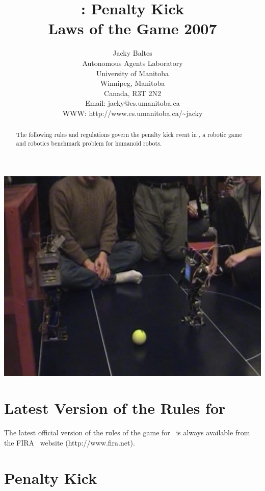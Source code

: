\documentclass[12pt]{hurocup}
\begin{document}
\title{\HuroCup: Penalty Kick\\
  Laws of the Game 2007}


\author{Jacky Baltes\\
Autonomous Agents Laboratory\\
University of Manitoba\\
Winnipeg, Manitoba\\
Canada, R3T 2N2\\
Email: jacky@cs.umanitoba.ca\\
WWW: http://www.cs.umanitoba.ca/\~{ }jacky
}

\maketitle

\begin{center}
 \includegraphics[width=0.7\linewidth]{Figures/penalty-kick-life}
\end{center}

\begin{abstract}
The following rules and regulations govern the penalty kick event in
\HuroCup, a robotic game and robotics benchmark problem for humanoid
robots.
%
\end{abstract}

\section*{Latest Version of the Rules for \HuroCup}
\label{sec:updates}

The latest official version of the rules of the game for \HuroCup\ is
always available from the FIRA \HuroCup\ website (http://www.fira.net).

\newpage

\section{Penalty Kick}
\label{sec:penalty-kick}
\end{document}
